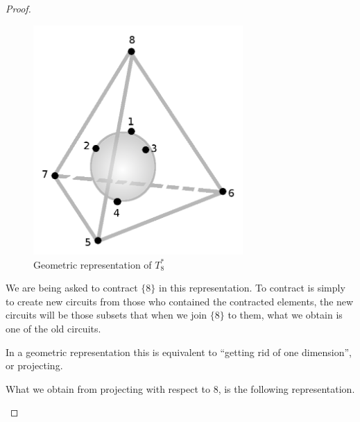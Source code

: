 \begin{proof}
\begin{enumerate}[label=(\roman*)]
            \begin{figure}[H]
                \begin{center}
                    \includegraphics[width=8cm]{Test2/Problem7/T8DualGraphicRepresentation.png}
                \end{center}                            
                \caption{Geometric representation of $T_8^*$}
                \label{t2:p7_T8DualGraphicRepresentation.png}                        
            \end{figure}\pn 
                       
            We are being asked to contract $\{8\}$ in this representation. To contract is simply to create new circuits from those who
            contained the contracted elements, the new circuits will be those subsets that when we join $\{8\}$ to them, what we obtain
            is one of the old circuits.\pn
            
            In a geometric representation this is equivalent to ``getting rid of one dimension'', or projecting.\pn
            
            What we obtain from projecting with respect to 8, is the following representation.\pn
            

\end{enumerate}
\end{proof}
